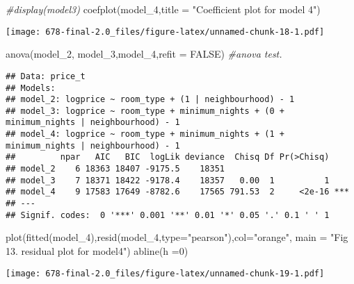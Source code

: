 \documentclass[
]{article}
\newenvironment{Shaded}{\begin{snugshade}}{\end{snugshade}}
\newcommand{\AttributeTok}[1]{\textcolor[rgb]{0.77,0.63,0.00}{#1}}
\newcommand{\CommentTok}[1]{\textcolor[rgb]{0.56,0.35,0.01}{\textit{#1}}}
\newcommand{\ConstantTok}[1]{\textcolor[rgb]{0.00,0.00,0.00}{#1}}
\newcommand{\DecValTok}[1]{\textcolor[rgb]{0.00,0.00,0.81}{#1}}
\newcommand{\FunctionTok}[1]{\textcolor[rgb]{0.00,0.00,0.00}{#1}}
\newcommand{\NormalTok}[1]{#1}
\newcommand{\StringTok}[1]{\textcolor[rgb]{0.31,0.60,0.02}{#1}}
\begin{document}
\begin{Shaded}
\begin{Highlighting}[]
\CommentTok{\#display(model3)}
\FunctionTok{coefplot}\NormalTok{(model\_4,}\AttributeTok{title =} \StringTok{"Coefficient plot for model 4"}\NormalTok{)}
\end{Highlighting}
\end{Shaded}

\texttt{[image: 678-final-2.0\_files/figure-latex/unnamed-chunk-18-1.pdf]}

\begin{Shaded}
\begin{Highlighting}[]
\FunctionTok{anova}\NormalTok{(model\_2, model\_3,model\_4,}\AttributeTok{refit =} \ConstantTok{FALSE}\NormalTok{) }\CommentTok{\#anova test.}
\end{Highlighting}
\end{Shaded}

\begin{verbatim}
## Data: price_t
## Models:
## model_2: logprice ~ room_type + (1 | neighbourhood) - 1
## model_3: logprice ~ room_type + minimum_nights + (0 + minimum_nights | neighbourhood) - 1
## model_4: logprice ~ room_type + minimum_nights + (1 + minimum_nights | neighbourhood) - 1
##         npar   AIC   BIC  logLik deviance  Chisq Df Pr(>Chisq)    
## model_2    6 18363 18407 -9175.5    18351                         
## model_3    7 18371 18422 -9178.4    18357   0.00  1          1    
## model_4    9 17583 17649 -8782.6    17565 791.53  2     <2e-16 ***
## ---
## Signif. codes:  0 '***' 0.001 '**' 0.01 '*' 0.05 '.' 0.1 ' ' 1
\end{verbatim}

\begin{Shaded}
\begin{Highlighting}[]
\FunctionTok{plot}\NormalTok{(}\FunctionTok{fitted}\NormalTok{(model\_4),}\FunctionTok{resid}\NormalTok{(model\_4,}\AttributeTok{type=}\StringTok{"pearson"}\NormalTok{),}\AttributeTok{col=}\StringTok{"orange"}\NormalTok{, }\AttributeTok{main =} \StringTok{"Fig 13. residual plot for model4"}\NormalTok{)}
\FunctionTok{abline}\NormalTok{(}\AttributeTok{h =}\DecValTok{0}\NormalTok{)}
\end{Highlighting}
\end{Shaded}

\texttt{[image: 678-final-2.0\_files/figure-latex/unnamed-chunk-19-1.pdf]}
\end{document}

